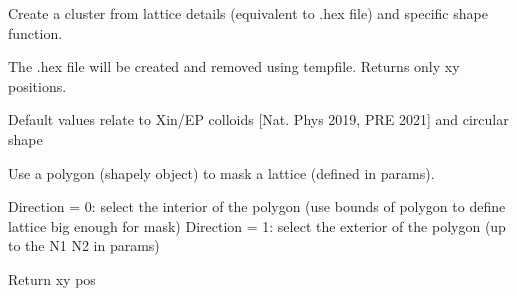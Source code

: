 \documentclass[letterpaper,10pt,english]{sphinxmanual}
\begin{document}

\begin{fulllineitems}
\label{\detokenize{tool_create_cluster:tool_create_cluster.cluster_inhex_Nl}}
\pysigstartsignatures
{}
\pysigstopsignatures
\sphinxAtStartPar
Create a cluster from lattice details (equivalent to .hex file) and specific shape function.

\sphinxAtStartPar
The .hex file will be created and removed using tempfile.
Returns only xy positions.

\sphinxAtStartPar
Default values relate to Xin/EP colloids {[}Nat. Phys 2019, PRE 2021{]} and circular shape

\end{fulllineitems}


\begin{fulllineitems}
\label{\detokenize{tool_create_cluster:tool_create_cluster.cluster_poly}}
\pysigstartsignatures
{}
\pysigstopsignatures
\sphinxAtStartPar
Use a polygon (shapely object) to mask a lattice (defined in params).

\sphinxAtStartPar
Direction = 0: select the interior of the polygon (use bounds of polygon to define lattice big enough for mask)
Direction = 1: select the exterior of the polygon (up to the N1 N2 in params)

\sphinxAtStartPar
Return xy pos

\end{fulllineitems}
\end{document}
